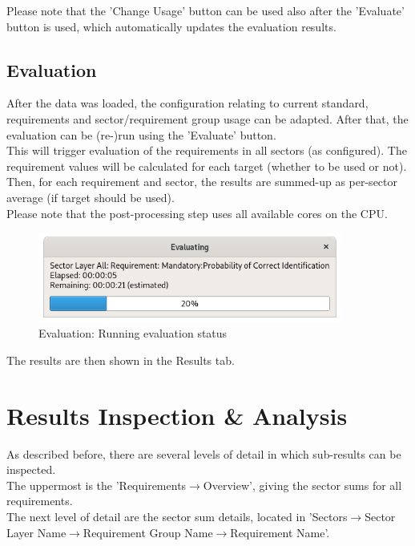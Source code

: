 Please note that the 'Change Usage' button can be used also after the 'Evaluate' button is used, which automatically updates the evaluation results.

\subsection{Evaluation}
\label{sec:eval_run_eval} 

After the data was loaded, the configuration relating to current standard, requirements and sector/requirement group usage can be adapted. After that, the evaluation can be (re-)run using the 'Evaluate' button. \\

This will trigger evaluation of the requirements in all sectors (as configured). The requirement values will be calculated for each target (whether to be used or not). Then, for each requirement and sector, the results are summed-up as per-sector average (if target should be used). \\

Please note that the post-processing step uses all available cores on the CPU.

\begin{figure}[H]
  \centering 
    \includegraphics[width=10cm]{figures/eval_eval_status.png}
  \caption{Evaluation: Running evaluation status}
\end{figure}

The results are then shown in the Results tab.

\section{Results Inspection \& Analysis}
\label{sec:eval_inspect}

As described before, there are several levels of detail in which sub-results can be inspected.\\

The uppermost is the 'Requirements$\rightarrow$Overview', giving the sector sums for all requirements. \\

The next level of detail are the sector sum details, located in 'Sectors$\rightarrow$Sector Layer Name$\rightarrow$Requirement Group Name$\rightarrow$Requirement Name'. \\

